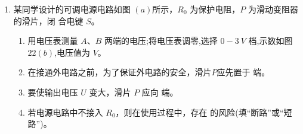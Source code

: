 \begin{enumerate}
\item 
{}
某同学设计的可调电源电路如图 $ (a) $所示，$ R_{0} $ 为保护电阻，$ P $ 为滑动变阻器的滑片，闭
合电键 $ S $。
\begin{figure}[h!]
\centering
\begin{subfigure}{0.4\linewidth}
\centering
 
\caption{}\label{}
\end{subfigure}
\begin{subfigure}{0.4\linewidth}
\centering
 
\caption{}\label{}
\end{subfigure}
\end{figure}

\begin{enumerate}
\item
用电压表测量 $ A $、$ B $ 两端的电压;将电压表调零,选择 $ 0-3 \ V $ 档,示数如图 $ 22(b) $,电压值为
\underlinegap 
$ V $。

\item 
在接通外电路之前，为了保证外电路的安全，滑片$ P $应先置于
\underlinegap 
端。

\item 
要使输出电压 $ U $ 变大，滑片 $ P $ 应向 \underlinegap 端。



\item 
若电源电路中不接入 $ R_{0} $，则在使用过程中，存在 \underlinegap 
的风险(填“断路”或“短路”)。

\end{enumerate}





\end{enumerate}
